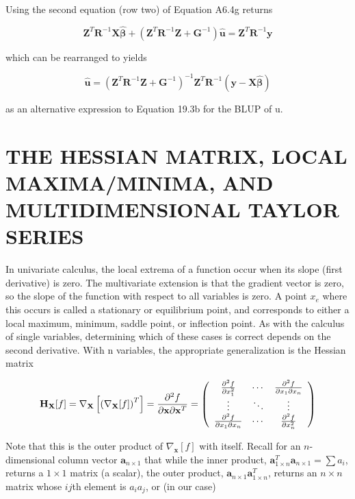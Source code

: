 \documentclass{article}
\begin{document}
Using the second equation (row two) of Equation A6.4g returns

\begin{equation}
\mathbf{Z}^{T}\mathbf{R}^{-1}\mathbf{X}\widehat{\boldsymbol{\beta}}+\left(\mathbf{Z}^{T}\mathbf{R}^{-1}\mathbf{Z}+\mathbf{G}^{-1}\right)\widehat{\mathbf{u}}=\mathbf{Z}^{T}\mathbf{R}^{-1}\mathbf{y}
\end{equation}

which can be rearranged to yields

\begin{equation}
\hat{\mathbf{u}}=\left(\mathbf{Z}^{T}\mathbf{R}^{-1}\mathbf{Z}+\mathbf{G}^{-1}\right)^{-1}\mathbf{Z}^{T}\mathbf{R}^{-1}\left(\mathbf{y}-\mathbf{X}\hat{\boldsymbol{\beta}}\right)
\end{equation}

as an alternative expression to Equation 19.3b for the BLUP of u.

\section{THE HESSIAN MATRIX, LOCAL MAXIMA/MINIMA, AND MULTIDIMENSIONAL TAYLOR SERIES}
In univariate calculus, the local extrema of a function occur when its slope (first derivative) is zero. The multivariate extension is that the gradient vector is zero, so the slope of the function with respect to all variables is zero. A point  $ x_{e} $ where this occurs is called a stationary or equilibrium point, and corresponds to either a local maximum, minimum, saddle point, or inflection point. As with the calculus of single variables, determining which of these cases is correct depends on the second derivative. With n variables, the appropriate generalization is the Hessian matrix

\begin{equation}
\mathbf{H}_{\mathbf{X}}[f]=\nabla_{\mathbf{X}}\left[\left(\nabla_{\mathbf{X}}[f]\right)^{T}\right]=\frac{\partial^{2}f}{\partial\mathbf{x}\partial\mathbf{x}^{T}}=\left(\begin{array}{c c c}\frac{\partial^{2}f}{\partial x_{1}^{2}}&\cdots&\frac{\partial^{2}f}{\partial x_{1}\partial x_{n}}\\ \vdots&\ddots&\vdots\\ \frac{\partial^{2}f}{\partial x_{1}\partial x_{n}}&\cdots&\frac{\partial^{2}f}{\partial x_{n}^{2}}\end{array}\right)
\end{equation}

Note that this is the outer product of  $ \nabla_{\mathbf{x}} [f] $ with itself. Recall for an  $ n $-dimensional column vector  $ \mathbf{a}_{n\times1} $ that while the inner product,  $ \mathbf{a}_{1\times n}^T \mathbf{a}_{n\times1} = \sum a_i $, returns a  $ 1 \times 1 $ matrix (a scalar), the outer product,  $ \mathbf{a}_{n\times1} \mathbf{a}_{1\times n}^T $, returns an  $ n \times n $ matrix whose  $ ij $th element is  $ a_i a_j $, or (in our case)
\end{document}
